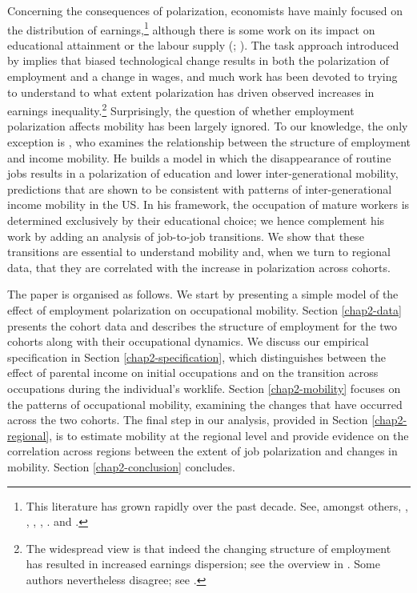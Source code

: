 Concerning the consequences of polarization, economists have mainly focused on the distribution of earnings,\footnote{This literature has grown rapidly over the past decade. See, amongst others, \citet{Autor2013Growth}, \citet{Beaudry2016Great}, \citet{Caines2017Complex}, \citet{Ross2017Routine}, \citet{Barany2018Job}. and \citet{Longmuir2020Routinization}.} although there is some work on its impact on educational attainment or the labour supply  (\citealt{Spitz-Oener2006Technical}; \citealt{Verdugo2020Labour}). The task approach introduced by \citet{Autor2003Skill} implies that biased technological change results in both the polarization of employment and a change in wages, and much work has been devoted to trying to understand to what extent polarization has driven observed increases in earnings inequality.\footnote{The widespread view is that indeed the changing structure of employment has resulted in increased earnings dispersion; see the overview in \citet{Acemoglu2011Skills}. Some authors nevertheless disagree; see \citet{Hunt2019Employment}.} Surprisingly, the question of whether employment polarization affects mobility has been largely ignored. To our knowledge, the only exception is \citet{Hennig2021Labor}, who examines the relationship between the structure of employment and income mobility. He builds a model in which the disappearance of routine jobs results in a polarization of education and lower inter-generational mobility, predictions that are shown to be consistent with patterns of inter-generational income mobility in the US. In his framework, the occupation of mature workers is determined exclusively by their educational choice; we hence complement his work by adding an analysis of job-to-job transitions. We show that these transitions are essential to understand mobility and, when we turn to regional data, that they are correlated with the increase in polarization across cohorts. 

The paper is organised as follows. We start by presenting a simple model of the effect of employment polarization on occupational mobility. Section \ref{chap2-data} presents the cohort data and describes the structure of employment for the two cohorts along with their occupational dynamics. We discuss our empirical specification in Section \ref{chap2-specification}, which distinguishes between the effect of parental income on initial occupations and on the transition across occupations during the individual's worklife. Section \ref{chap2-mobility} focuses on the patterns of occupational mobility, examining the changes that have occurred across the two cohorts. The final step in our analysis, provided in Section \ref{chap2-regional}, is to estimate mobility at the regional level and provide evidence on the correlation across regions between the extent of job polarization and changes in mobility. Section \ref{chap2-conclusion} concludes.
